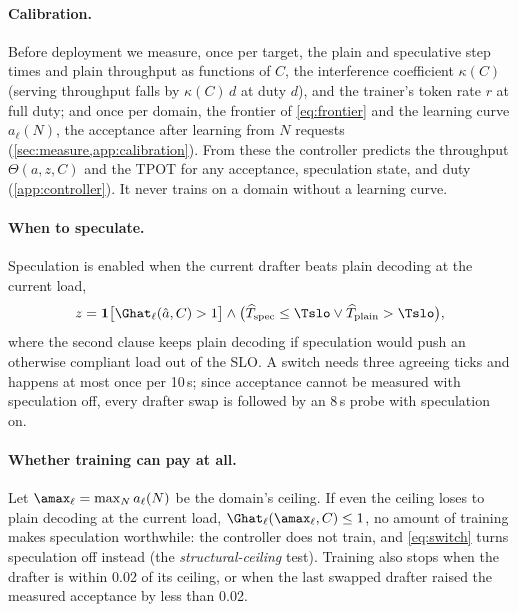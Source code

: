 \paragraph{Calibration.} Before deployment we measure, once per target, the plain and speculative step times and plain throughput as functions of $C$, the interference coefficient $\kappa(C)$ (serving throughput falls by $\kappa(C)\,d$ at duty $d$), and the trainer's token rate $r$ at full duty; and once per domain, the frontier of \cref{eq:frontier} and the learning curve $a_\ell(N)$, the acceptance after learning from $N$ requests (\cref{sec:measure,app:calibration}). From these the controller predicts the throughput $\Theta(a,z,C)$ and the TPOT for any acceptance, speculation state, and duty (\cref{app:controller}). It never trains on a domain without a learning curve.

\paragraph{When to speculate.} Speculation is enabled when the current drafter beats plain decoding at the current load,
\begin{equation}
z=\mathbf{1}\big[\Ghat_\ell(\hat a,C)>1\big]\wedge\big(\widehat T_{\mathrm{spec}}\le\Tslo\vee\widehat T_{\mathrm{plain}}>\Tslo\big),\label{eq:switch}
\end{equation}
where the second clause keeps plain decoding if speculation would push an otherwise compliant load out of the SLO. A switch needs three agreeing ticks and happens at most once per 10\,s; since acceptance cannot be measured with speculation off, every drafter swap is followed by an 8\,s probe with speculation on.

\paragraph{Whether training can pay at all.} Let $\amax_\ell=\max_N a_\ell(N)$ be the domain's ceiling. If even the ceiling loses to plain decoding at the current load, $\Ghat_\ell(\amax_\ell,C)\le1$, no amount of training makes speculation worthwhile: the controller does not train, and \cref{eq:switch} turns speculation off instead (the \emph{structural-ceiling} test). Training also stops when the drafter is within 0.02 of its ceiling, or when the last swapped drafter raised the measured acceptance by less than 0.02.

